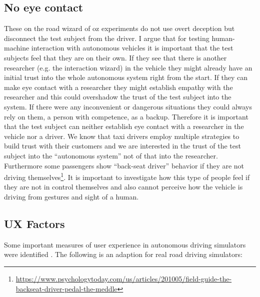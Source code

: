 \subsection{No eye contact}
These on the road wizard of oz experiments do not use overt deception but disconnect the test subject from the driver. I argue that for testing human-machine interaction with autonomous vehicles it is important that the test subjects feel that they are on their own. If they see that there is another researcher (e.g. the interaction wizard) in the vehicle they might already have an initial trust into the whole autonomous system right from the start. If they can make eye contact with a researcher they might establish empathy with the researcher \cite{Haase1972NonverbalCommunication} and this could overshadow the trust of the test subject into the system. If there were any inconvenient or dangerous situations they could always rely on them, a person with competence, as a backup. Therefore it is important that the test subject can neither establish eye contact with a researcher in the vehicle nor a driver. We know that taxi drivers employ multiple strategies to build trust with their customers \cite{Gambetta2005Streetwise} and we are interested in the trust of the test subject into the “autonomous system” not of that into the researcher. Furthermore some passengers show “back-seat driver” behavior if they are not driving themselves\footnote{\url{https://www.psychologytoday.com/us/articles/201005/field-guide-the-backseat-driver-pedal-the-meddle}}. It is important to investigate how this type of people feel if they are not in control themselves and also cannot perceive how the vehicle is driving from gestures and sight of a human. 

\subsection{UX Factors}
\label{UXfactors}
Some important measures of user experience in autonomous driving simulators were identified \cite{Ive}. The following is an adaption for real road driving simulators: 

